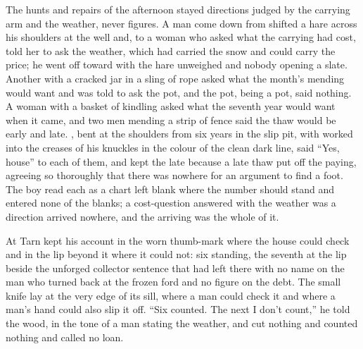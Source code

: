 \scenebreak

The hunts and repairs of the afternoon stayed directions judged by the carrying arm and the weather, never figures. A man come down from  shifted a hare across his shoulders at the well and, to a woman who asked what the carrying had cost, told her to ask the weather, which had carried the snow and could carry the price; he went off toward  with the hare unweighed and nobody opening a slate. Another with a cracked jar in a sling of rope asked what the month's mending would want and was told to ask the pot, and the pot, being a pot, said nothing. A woman with a basket of kindling asked what the seventh year would want when it came, and two men mending a strip of fence said the thaw would be early and late. , bent at the shoulders from six years in the slip pit, with  worked into the creases of his knuckles in the colour of the clean dark line, said “Yes, house” to each of them, and kept the late because a late thaw put off the paying, agreeing so thoroughly that there was nowhere for an argument to find a foot. The boy read each as a chart left blank where the number should stand and entered none of the blanks; a cost-question answered with the weather was a direction arrived nowhere, and the arriving was the whole of it.

At  Tarn kept his account in the worn thumb-mark where the house could check and in the lip beyond it where it could not: six standing, the seventh at the lip beside the unforged collector sentence that  had left there with no name on the man who turned back at the frozen ford and no figure on the debt. The small knife lay at the very edge of its sill, where a man could check it and where a man's hand could also slip it off. “Six counted. The next I don't count,” he told the wood, in the tone of a man stating the weather, and cut nothing and counted nothing and called no loan.

